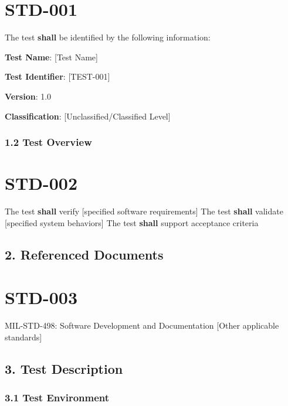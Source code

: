 \section{STD-001}\label{STD-001}

The test \textbf{shall} be identified by the following information:
\begin{itemizeDeep}
\item \textbf{Test Name}: [Test Name]
\item \textbf{Test Identifier}: [TEST-001]
\item \textbf{Version}: 1.0
\item \textbf{Classification}: [Unclassified/Classified Level]
\end{itemizeDeep}

\subsubsection{1.2 Test Overview}

\section{STD-002}\label{STD-002}

The test \textbf{shall} verify [specified software requirements]
The test \textbf{shall} validate [specified system behaviors]
The test \textbf{shall} support acceptance criteria

\subsection{2. Referenced Documents}

\section{STD-003}\label{STD-003}

MIL-STD-498: Software Development and Documentation
[Other applicable standards]\\

\subsection{3. Test Description}

\subsubsection{3.1 Test Environment}


